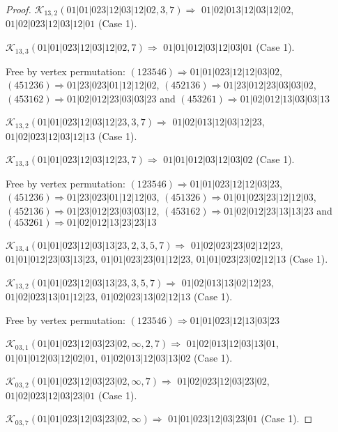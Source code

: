 \documentclass[12pt]{article}
\theoremstyle{plain}
\theoremstyle{definition}
\theoremstyle{remark}
\newcommand{\fancy}[1]{\mathcal{#1}}
\def\K{\fancy{K}}
\begin{document}
\begin{proof}
	
	\bigskip
	
	$\K_{13,2}(01|01|023|12|03|12|02,3, 7)\Rightarrow $ $01|02|013|12|03|12|02$, $01|02|023|12|03|12|01$ (Case 1).
	
	$\K_{13,3}(01|01|023|12|03|12|02,7)\Rightarrow $ $01|01|012|03|12|03|01$ (Case 1).
	
	
	
	Free by vertex permutation: $(1 2 3 5 4 6)\Rightarrow 01|01|023|12|12|03|02$, $(4 5 1 2 3 6)\Rightarrow 01|23|023|01|12|12|02$, $(4 5 2 1 3 6)\Rightarrow 01|23|012|23|03|03|02$, $(4 5 3 1 6 2)\Rightarrow 01|02|012|23|03|03|23$ and $(4 5 3 2 6 1)\Rightarrow 01|02|012|13|03|03|13$
	
	
	
	\bigskip
	
	$\K_{13,2}(01|01|023|12|03|12|23,3, 7)\Rightarrow $ $01|02|013|12|03|12|23$, $01|02|023|12|03|12|13$ (Case 1).
	
	$\K_{13,3}(01|01|023|12|03|12|23,7)\Rightarrow $ $01|01|012|03|12|03|02$ (Case 1).
	
	
	
	Free by vertex permutation: $(1 2 3 5 4 6)\Rightarrow 01|01|023|12|12|03|23$, $(4 5 1 2 3 6)\Rightarrow 01|23|023|01|12|12|03$, $(4 5 1 3 2 6)\Rightarrow 01|01|023|23|12|12|03$, $(4 5 2 1 3 6)\Rightarrow 01|23|012|23|03|03|12$, $(4 5 3 1 6 2)\Rightarrow 01|02|012|23|13|13|23$ and $(4 5 3 2 6 1)\Rightarrow 01|02|012|13|23|23|13$
	
	
	
	\bigskip
	
	$\K_{13,4}(01|01|023|12|03|13|23,2, 3, 5, 7)\Rightarrow $ $01|02|023|23|02|12|23$, $01|01|012|23|03|13|23$, $01|01|023|23|01|12|23$, $01|01|023|23|02|12|13$ (Case 1).
	
	$\K_{13,2}(01|01|023|12|03|13|23,3, 5, 7)\Rightarrow $ $01|02|013|13|02|12|23$, $01|02|023|13|01|12|23$, $01|02|023|13|02|12|13$ (Case 1).
	
	
	
	Free by vertex permutation: $(1 2 3 5 4 6)\Rightarrow 01|01|023|12|13|03|23$
	
	
	
	\bigskip
	
	$\K_{03,1}(01|01|023|12|03|23|02,\infty,2, 7)\Rightarrow $ $01|02|013|12|03|13|01$, $01|01|012|03|12|02|01$, $01|02|013|12|03|13|02$ (Case 1).
	
	$\K_{03,2}(01|01|023|12|03|23|02,\infty,7)\Rightarrow $ $01|02|023|12|03|23|02$, $01|02|023|12|03|23|01$ (Case 1).
	
	$\K_{03,7}(01|01|023|12|03|23|02,\infty)\Rightarrow $ $01|01|023|12|03|23|01$ (Case 1).
	

\end{proof}
\end{document}

